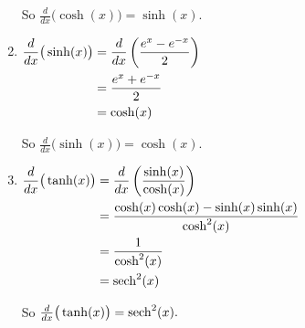 \begin{example}
\begin{enumerate}[1)]
So $\frac{d}{dx}\big(\cosh (x)\big) = \sinh (x).$
	
\item  $\begin{aligned}[t]
\frac{d}{dx}\big(\sinh (x)\big) &= \frac{d}{dx}\left(\frac{e^x-e^{-x}}2\right) \\
&= \frac{e^x+e^{-x}}2\\
&= \cosh (x)
\end{aligned}\hfill$

So $\frac{d}{dx}\big(\sinh (x)\big) = \cosh (x).$
	
\item  $\begin{aligned}[t]
\frac{d}{dx}\big(\tanh (x)\big) &= \frac{d}{dx}\left(\frac{\sinh (x)}{\cosh (x)}\right) \\
&= \frac{\cosh (x) \cosh (x) - \sinh (x) \sinh (x)}{\cosh^2 (x)}\\
&= \frac{1}{\cosh^2 (x)}\\
&= \sech^2 (x)
\end{aligned}\hfill$

So $\frac{d}{dx}\big(\tanh (x)\big) = \operatorname{sech}^2 (x).$	
\end{enumerate}

\end{example}